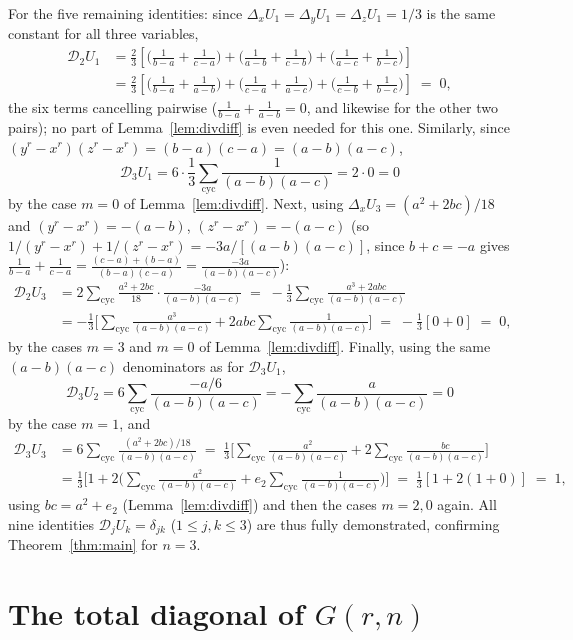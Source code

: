 \documentclass[10pt,a4paper]{amsart}
\begin{document}
For the five remaining identities: since $\Delta_xU_1=\Delta_yU_1=\Delta_zU_1=1/3$ is the same constant for all three variables,
\begin{align*}
\mathcal D_2U_1 &= \frac23\left[\Big(\frac1{b-a}+\frac1{c-a}\Big)+\Big(\frac1{a-b}+\frac1{c-b}\Big)+\Big(\frac1{a-c}+\frac1{b-c}\Big)\right] \\
&= \frac23\left[\Big(\frac1{b-a}+\frac1{a-b}\Big)+\Big(\frac1{c-a}+\frac1{a-c}\Big)+\Big(\frac1{c-b}+\frac1{b-c}\Big)\right] \;=\; 0,
\end{align*}
the six terms cancelling pairwise ($\frac1{b-a}+\frac1{a-b}=0$, and likewise for the other two pairs); no part of Lemma~\ref{lem:divdiff} is even needed for this one. Similarly, since $(y^r-x^r)(z^r-x^r)=(b-a)(c-a)=(a-b)(a-c)$,
\[
\mathcal D_3U_1 = 6\cdot\frac13\sum_{\mathrm{cyc}}\frac1{(a-b)(a-c)} = 2\cdot0 = 0
\]
by the case $m=0$ of Lemma~\ref{lem:divdiff}. Next, using $\Delta_xU_3=(a^2+2bc)/18$ and $(y^r-x^r)=-( a-b)$, $(z^r-x^r)=-(a-c)$ (so $1/(y^r-x^r)+1/(z^r-x^r)=-3a/[(a-b)(a-c)]$, since $b+c=-a$ gives $\frac1{b-a}+\frac1{c-a}=\frac{(c-a)+(b-a)}{(b-a)(c-a)}=\frac{-3a}{(a-b)(a-c)}$):
\begin{align*}
\mathcal D_2U_3 &= 2\sum_{\mathrm{cyc}}\frac{a^2+2bc}{18}\cdot\frac{-3a}{(a-b)(a-c)} \;=\; -\frac13\sum_{\mathrm{cyc}}\frac{a^3+2abc}{(a-b)(a-c)} \\
&= -\frac13\Big[\sum_{\mathrm{cyc}}\frac{a^3}{(a-b)(a-c)} + 2abc\sum_{\mathrm{cyc}}\frac1{(a-b)(a-c)}\Big] \;=\; -\frac13[0+0]\;=\;0,
\end{align*}
by the cases $m=3$ and $m=0$ of Lemma~\ref{lem:divdiff}. Finally, using the same $(a-b)(a-c)$ denominators as for $\mathcal D_3U_1$,
\[
\mathcal D_3U_2 = 6\sum_{\mathrm{cyc}}\frac{-a/6}{(a-b)(a-c)} = -\sum_{\mathrm{cyc}}\frac{a}{(a-b)(a-c)} = 0
\]
by the case $m=1$, and
\begin{align*}
\mathcal D_3U_3 &= 6\sum_{\mathrm{cyc}}\frac{(a^2+2bc)/18}{(a-b)(a-c)} \;=\; \frac13\Big[\sum_{\mathrm{cyc}}\frac{a^2}{(a-b)(a-c)} + 2\sum_{\mathrm{cyc}}\frac{bc}{(a-b)(a-c)}\Big] \\
&= \frac13\Big[1 + 2\Big(\sum_{\mathrm{cyc}}\frac{a^2}{(a-b)(a-c)} + e_2\sum_{\mathrm{cyc}}\frac1{(a-b)(a-c)}\Big)\Big] \;=\; \frac13[1+2(1+0)]\;=\;1,
\end{align*}
using $bc=a^2+e_2$ (Lemma~\ref{lem:divdiff}) and then the cases $m=2,0$ again. All nine identities $\mathcal D_jU_k=\delta_{jk}$ ($1\le j,k\le3$) are thus fully demonstrated, confirming Theorem~\ref{thm:main} for $n=3$.

\section{The total diagonal of $G(r,n)$}\label{sec:diagonale}
\end{document}
